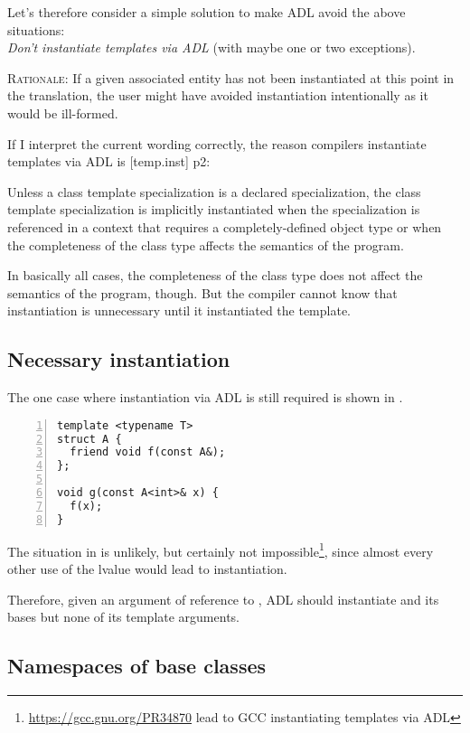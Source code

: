 Let's therefore consider a simple solution to make ADL avoid the above situations:\\
\emph{Don't instantiate templates via ADL} (with maybe one or two exceptions).

\textsc{Rationale:} If a given associated entity has not been instantiated at this point 
in the translation, the user might have avoided instantiation intentionally as it would be 
ill-formed.

If I interpret the current wording correctly, the reason compilers instantiate templates 
via ADL is [temp.inst] p2:
\begin{wgText}
Unless a class template specialization is a declared specialization, the class template 
specialization is implicitly instantiated when the specialization is referenced in a 
context that requires a completely-defined object type or when the completeness of the 
class type affects the semantics of the program.
\end{wgText}
In basically all cases, the completeness of the class type does not affect the semantics 
of the program, though. But the compiler cannot know that instantiation is unnecessary 
until it instantiated the template.


\subsection{Necessary instantiation}

The one case where instantiation via ADL is still required is shown in 
.
\begin{lstlisting}[style=Vc,numbers=left,float,label=lst:needsInstantiation,caption={
Requires instantiation or reasonable code could break.
}]
template <typename T>
struct A {
  friend void f(const A&);
};

void g(const A<int>& x) {
  f(x);
}
\end{lstlisting}
The situation in  is unlikely, but certainly not 
impossible\footnote{\url{https://gcc.gnu.org/PR34870} lead to GCC instantiating templates 
via ADL}, since almost every other use of the lvalue  would lead to instantiation.

Therefore, given an argument of reference to , ADL should instantiate  and 
its bases but none of its template arguments.

\subsection{Namespaces of base classes}


